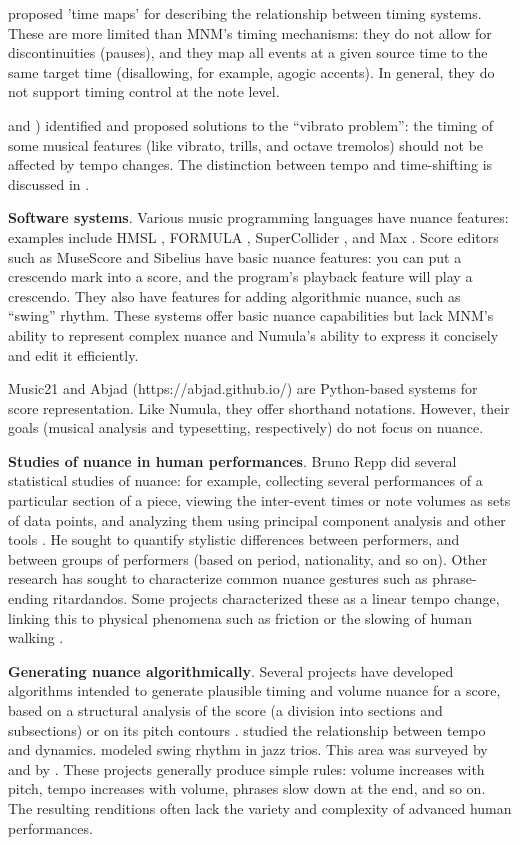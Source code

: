 \documentclass[letterpaper, 12pt]{article}
\begin{document}
\cite{Jaffe1985} proposed 'time maps' for describing
the relationship between timing systems.
These are more limited than MNM's timing mechanisms:
they do not allow for discontinuities (pauses),
and they map all events at a given source time to the same target time
(disallowing, for example, agogic accents).
In general, they do not support timing control at the note level.

\cite{Dannenbert1997} and \cite{Honing2005})
identified and proposed solutions to the ``vibrato problem'':
the timing of some musical features
(like vibrato, trills, and octave tremolos)
should not be affected by tempo changes.
The distinction between tempo and time-shifting is discussed in
\cite{Honing2001}.

\textbf{Software systems}.
Various music programming languages have nuance features:
examples include HMSL \citep{Polansky1990},
FORMULA \citep{Anderson1991},
SuperCollider \citep{McCartney2002},
and Max \citep{Puckette2002}.
Score editors such as MuseScore and Sibelius have basic nuance features:
you can put a crescendo mark into a score,
and the program's playback feature will play a crescendo.
They also have features for adding algorithmic nuance,
such as ``swing'' rhythm.
These systems offer basic nuance capabilities
but lack MNM's ability to represent complex nuance
and Numula's ability to express it concisely and edit it efficiently.

Music21 \citep{Cuthbert2010} and Abjad (https://abjad.github.io/)
are Python-based systems for score representation.
Like Numula, they offer shorthand notations.
However, their goals (musical analysis and typesetting, respectively)
do not focus on nuance.

\textbf{Studies of nuance in human performances}.
Bruno Repp did several statistical studies of nuance:
for example, collecting several performances of
a particular section of a piece,
viewing the inter-event times or note volumes as sets of data points,
and analyzing them using principal component analysis and other tools
\citep{Repp1998, Repp1999}.
He sought to quantify stylistic differences between performers,
and between groups of performers (based on period, nationality, and so on).
Other research has sought to characterize common nuance gestures such as
phrase-ending ritardandos.
Some projects characterized these as a linear tempo change,
linking this to physical phenomena such as friction
or the slowing of human walking \citep{Friberg1999}.

\textbf{Generating nuance algorithmically}.
Several projects have developed algorithms
intended to generate plausible timing and volume nuance for a score,
based on a structural analysis of the score
(a division into sections and subsections) or on its pitch contours
\citep{Friberg1991}.
\cite{Todd1992} studied the relationship between tempo and dynamics.
\cite{Friberg2023} modeled swing rhythm in jazz trios.
This area was surveyed by \cite{Kirke2009}
and by \cite{Cancino2018}.
These projects generally produce simple rules:
volume increases with pitch, tempo increases with volume,
phrases slow down at the end, and so on.
The resulting renditions often lack the variety and complexity
of advanced human performances.
\end{document}
